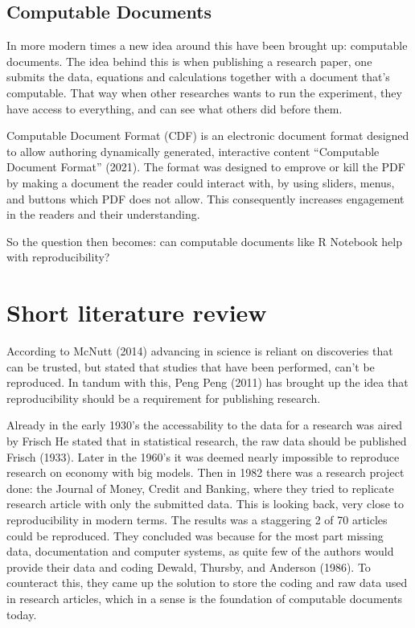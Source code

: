 \documentclass[
  12pt,
  twoside]{article}
\begin{document}
\hypertarget{computable-documents}{%
\subsection{Computable Documents}\label{computable-documents}}

In more modern times a new idea around this have been brought up:
computable documents. The idea behind this is when publishing a research
paper, one submits the data, equations and calculations together with a
document that's computable. That way when other researches wants to run
the experiment, they have access to everything, and can see what others
did before them.

Computable Document Format (CDF) is an electronic document format
designed to allow authoring dynamically generated, interactive content
{``Computable {Document Format}''} (2021). The format was designed to
emprove or kill the PDF by making a document the reader could interact
with, by using sliders, menus, and buttons which PDF does not allow.
This consequently increases engagement in the readers and their
understanding.

So the question then becomes: can computable documents like R Notebook
help with reproducibility?

\hypertarget{short-literature-review}{%
\section{Short literature review}\label{short-literature-review}}

According to McNutt (2014) advancing in science is reliant on
discoveries that can be trusted, but stated that studies that have been
performed, can't be reproduced. In tandum with this, Peng Peng (2011)
has brought up the idea that reproducibility should be a requirement for
publishing research.

Already in the early 1930's the accessability to the data for a research
was aired by Frisch He stated that in statistical research, the raw data
should be published Frisch (1933). Later in the 1960's it was deemed
nearly impossible to reproduce research on economy with big models. Then
in 1982 there was a research project done: the Journal of Money, Credit
and Banking, where they tried to replicate research article with only
the submitted data. This is looking back, very close to reproducibility
in modern terms. The results was a staggering 2 of 70 articles could be
reproduced. They concluded was because for the most part missing data,
documentation and computer systems, as quite few of the authors would
provide their data and coding Dewald, Thursby, and Anderson (1986). To
counteract this, they came up the solution to store the coding and raw
data used in research articles, which in a sense is the foundation of
computable documents today.
\end{document}
